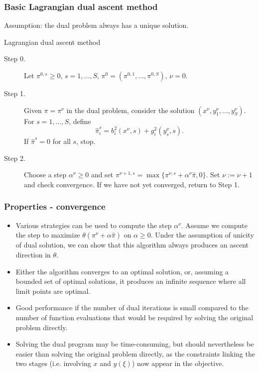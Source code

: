 \documentclass[french]{beamer}
\begin{document}
\begin{frame}
\frametitle{Basic Lagrangian dual ascent method}

Assumption: the dual problem always has a unique solution.

\begin{algo}{Lagrangian dual ascent method}
\begin{description}
\item[Step 0.] Let $\pi^{0,s} \geq 0$, $s = 1,\ldots,S$, $\pi^0 = (\pi^{0,1},\ldots,\pi^{0,S})$, $\nu = 0$.
\item[Step 1.]
Given $\pi = \pi^{\nu}$ in the dual problem, consider the solution
$(x^{\nu}, y_1^{\nu},\ldots{},y_S^{\nu})$.
For $s = 1, \ldots{}, S$, define
$$
\hat{\pi}_i^s = b_i^2(x^{\nu},s)+g_i^2(y_s^{\nu},s).
$$
If $\hat{\pi}^s = 0$ for all $s$, stop.
\item[Step 2.]
Choose a step $\alpha^{\nu} \geq 0$ and set
$
\pi^{\nu+1,s} = \max\{\pi^{\nu,s} + \alpha^{\nu}\hat{\pi}, 0\}.
$
Set $\nu := \nu+1$ and check convergence. If we have not yet converged, return to Step 1.
\end{description}
\end{algo}

\end{frame}

\begin{frame}
\frametitle{Properties - convergence}

\begin{itemize}
\item
Various strategies can be used to compute the step $\alpha^\nu$. Assume we compute the step to maximize $\theta(\pi^{\nu}+\alpha\hat{\pi})$ on $\alpha \geq 0$.
Under the assumption of unicity of dual solution, we can show that this algorithm always produces an {\blue ascent direction} in $\theta$.
\item
Either the algorithm converges to an optimal solution, or, assuming a bounded set of optimal solutions, it produces an infinite sequence where all limit points are optimal.
\item
Good performance if the number of dual iterations is small compared to the number of function evaluations that would be required by solving the original problem directly.
\item
Solving the dual program may be time-consuming, but should nevertheless be easier than solving the original problem directly, as the constraints linking the two stages (i.e. involving $x$ and $y(\xi)$) now appear in the objective.
\end{itemize}

\end{frame}
\end{document}
